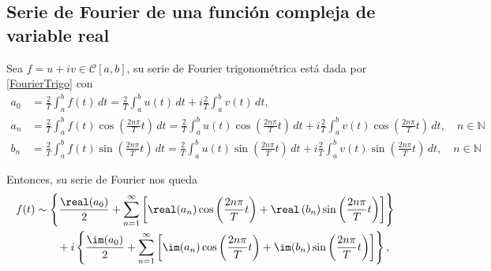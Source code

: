 





\subsection{Serie de Fourier de una función compleja de variable real}

Sea $f = u + iv \in \mathscr{C}[a,b]$, su serie de Fourier trigonométrica está dada por \eqref{FourierTrigo} con 
\begin{align*}
    a_0 &= \frac{2}{T} \int_{a}^{b} f(t) \,dt =  \frac{2}{T} \int_a^b u(t) \,dt + i\frac{2}{T} \int_a^b v(t) \,dt,\\
    a_n &= \frac{2}{T} \int_a^b f(t) \cos\left( \frac{2n\pi}{T}t \right) \,dt = \frac{2}{T} \int_a^b u(t) \cos\left( \frac{2n\pi}{T}t \right) \,dt + i\frac{2}{T} \int_a^b v(t) \cos\left( \frac{2n\pi}{T}t \right) \,dt , \quad n \in \mathbb{N} \\
    b_n &= \frac{2}{T} \int_a^b f(t) \sin\left( \frac{2n\pi}{T}t \right) \,dt = \frac{2}{T} \int_a^b u(t) \sin\left( \frac{2n\pi}{T}t \right) \,dt + i\frac{2}{T} \int_a^b v(t) \sin\left( \frac{2n\pi}{T}t \right) \,dt, \quad n \in \mathbb{N}
\end{align*}

Entonces, su serie de Fourier nos queda
\begin{align}
  f(t) & \sim   \left\{ \frac{\real(a_0)}{2} + \sum_{n=1}^{\infty} \left[ \real(a_n) \cos\left( \frac{2n\pi}{T}t \right) + \real\left( b_n \right) \sin\left( \frac{2n\pi}{T}t \right) \right] \right\}  \nonumber \\
   & \qquad + i \left\{ \frac{\im(a_0)}{2} + \sum_{n=1}^{\infty} \left[\im(a_n) \cos\left( \frac{2n\pi}{T}t \right) + \im(b_n) \sin\left( \frac{2n\pi}{T}t \right) \right] \right\},
\end{align}

